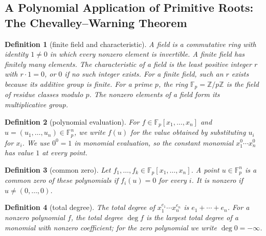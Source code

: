 \documentclass[11pt]{article}
\theoremstyle{ntstyle}
\newtheorem{definition}{Definition}[subsection]
\begin{document}
\subsection{A Polynomial Application of Primitive Roots: The Chevalley--Warning Theorem}

\begin{definition}[finite field and characteristic]\label{def:6.10.1}\label{def:finite-field-and-characteristic}
  A field is a commutative ring with identity $1\ne0$ in which every
  nonzero element is invertible. A finite field has finitely many elements. The
  characteristic of a field is the least positive integer $r$ with
  $r\cdot1=0$, or $0$ if no such integer exists. For a finite field,
  such an $r$ exists because its additive group is finite.
  For a prime $p$, the ring $\mathbb{F}_p=\mathbb{Z}/p\mathbb{Z}$ is the field of
  residue classes modulo $p$. The nonzero elements of a field form its
  multiplicative group.

\end{definition}

\begin{definition}[polynomial evaluation]\label{def:6.10.2}\label{def:polynomial-evaluation}
  For $f\in\mathbb{F}_p[x_1,\ldots,x_n]$ and
  $u=(u_1,\ldots,u_n)\in\mathbb{F}_p^n$, we write $f(u)$ for the value obtained by
  substituting $u_i$ for $x_i$. We use $0^0=1$ in monomial evaluation, so
  the constant monomial $x_1^0\cdots x_n^0$ has value $1$ at every point.

\end{definition}

\begin{definition}[common zero]\label{def:6.10.3}\label{def:common-zero}
  Let $f_1,\ldots,f_k\in\mathbb{F}_p[x_1,\ldots,x_n]$. A point
  $u\in\mathbb{F}_p^n$ is a common zero of these polynomials if
  $f_i(u)=0$ for every $i$. It is nonzero if $u\neq(0,\ldots,0)$.

\end{definition}

\begin{definition}[total degree]\label{def:6.10.4}\label{def:total-degree}
  The total degree of $x_1^{e_1}\cdots x_n^{e_n}$ is
  $e_1+\cdots+e_n$. For a nonzero polynomial $f$, the total degree $\deg f$ is the largest
  total degree of a monomial with nonzero coefficient; for the zero polynomial we write $\deg0=-\infty$.

\end{definition}
\end{document}
